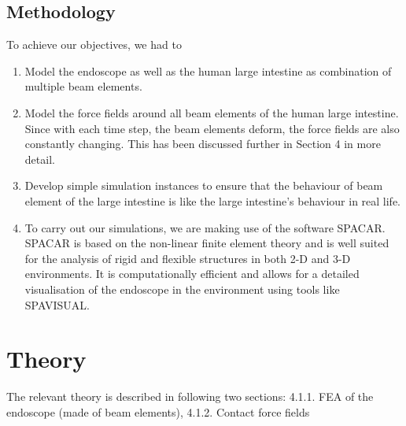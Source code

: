 \documentclass[12pt]{report}
\begin{document}
\subsection*{Methodology}
To achieve our objectives, we had to\par

\begin{enumerate}
	\item Model the endoscope as well as the human large intestine as combination of multiple beam elements.\par

	\item Model the force fields around all beam elements of the human large intestine. Since with each time step, the beam elements deform, the force fields are also constantly changing. This has been discussed further in Section 4 in more detail.\par

	\item Develop simple simulation instances to ensure that the behaviour of beam element of the large intestine is like the large intestine’s behaviour in real life.\par

	\item To carry out our simulations, we are making use of the software SPACAR. SPACAR is based on the non-linear finite element theory and is well suited for the analysis of rigid and flexible structures in both 2-D and 3-D environments. It is computationally efficient and allows for a detailed visualisation of the endoscope in the environment using tools like SPAVISUAL.
\end{enumerate}\par




\newpage

\vspace{\baselineskip}\section*{Theory}
The relevant theory is described in following two sections: 4.1.1. FEA of the endoscope (made of beam elements), 4.1.2. Contact force fields\par
\end{document}
